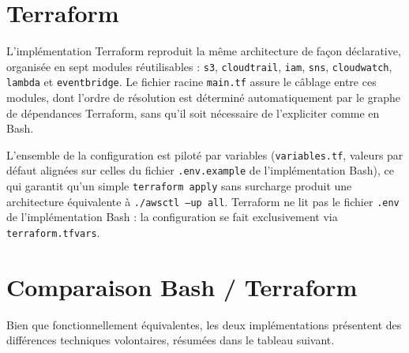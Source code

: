 \documentclass[11pt,a4paper]{report}
\begin{document}
\section{Terraform}

L'implémentation Terraform reproduit la même architecture de façon déclarative, organisée en sept modules réutilisables : \texttt{s3}, \texttt{cloudtrail}, \texttt{iam}, \texttt{sns}, \texttt{cloudwatch}, \texttt{lambda} et \texttt{eventbridge}. Le fichier racine \texttt{main.tf} assure le câblage entre ces modules, dont l'ordre de résolution est déterminé automatiquement par le graphe de dépendances Terraform, sans qu'il soit nécessaire de l'expliciter comme en Bash.

L'ensemble de la configuration est piloté par variables (\texttt{variables.tf}, valeurs par défaut alignées sur celles du fichier \texttt{.env.example} de l'implémentation Bash), ce qui garantit qu'un simple \texttt{terraform apply} sans surcharge produit une architecture équivalente à \texttt{./awsctl --up all}. Terraform ne lit pas le fichier \texttt{.env} de l'implémentation Bash : la configuration se fait exclusivement via \texttt{terraform.tfvars}.

\section{Comparaison Bash / Terraform}

Bien que fonctionnellement équivalentes, les deux implémentations présentent des différences techniques volontaires, résumées dans le tableau suivant.
\end{document}
